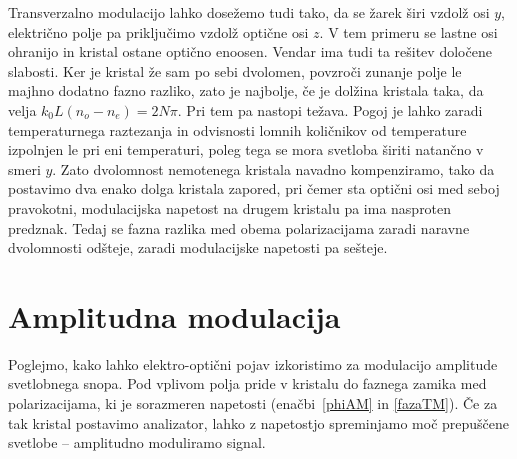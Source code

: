 \begin{remark}
Transverzalno modulacijo lahko dosežemo tudi tako, da se žarek širi vzdolž 
osi $y$, električno polje pa priključimo vzdolž optične osi $z$.
V tem primeru se lastne osi ohranijo in kristal ostane optično enoosen. Vendar 
 ima tudi ta rešitev določene slabosti. Ker je kristal že sam po sebi dvolomen, 
povzroči zunanje polje le majhno dodatno fazno razliko, zato je najbolje, če je dolžina 
kristala taka, da velja $k_{0}L(n_{o}-n_{e})=2N\pi$. Pri tem pa nastopi težava. 
Pogoj je lahko zaradi temperaturnega raztezanja in odvisnosti lomnih količnikov od temperature
izpolnjen le pri eni temperaturi, poleg tega se mora svetloba širiti natančno v smeri $y$.
Zato dvolomnost nemotenega kristala navadno kompenziramo, tako da postavimo 
dva enako dolga kristala zapored, pri čemer sta optični
osi med seboj pravokotni, modulacijska napetost na drugem kristalu pa ima
nasproten predznak. Tedaj se fazna razlika med obema polarizacijama zaradi 
naravne dvolomnosti odšteje, zaradi modulacijske napetosti pa sešteje.
\end{remark}

\section{Amplitudna modulacija}
\label{chap:ampmod}
Poglejmo, kako lahko elektro-optični pojav izkoristimo za modulacijo
amplitude svetlobnega snopa. Pod vplivom polja pride v kristalu do
faznega zamika med polarizacijama, ki je sorazmeren napetosti 
(enačbi~\ref{phiAM} in \ref{fazaTM}).
Če za tak kristal postavimo analizator, lahko z napetostjo spreminjamo 
moč prepuščene svetlobe -- amplitudno moduliramo signal.

